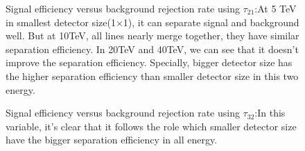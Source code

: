\begin{figure}
\begin{center}
\end{center}
\caption{Signal efficiency versus background rejection rate using $\tau_{21}$:At 5 TeV in smallest detector size(1$\times$1), it can separate signal and background well. But at 10TeV, all lines nearly merge together, they have similar separation efficiency. In 20TeV and 40TeV, we can see that it doesn't improve the separation efficiency. Specially, bigger detector size has the higher separation efficiency than smaller detector size in this two energy.}
\label{fig:cluster_tau21}
\end{figure}


\begin{figure}
\begin{center}
\end{center}
\caption{Signal efficiency versus background rejection rate using $\tau_{32}$:In this variable, it's clear that it follows the role which smaller detector size have the bigger separation efficiency in all energy.}
\label{fig:cluster_tau32}
\end{figure}

